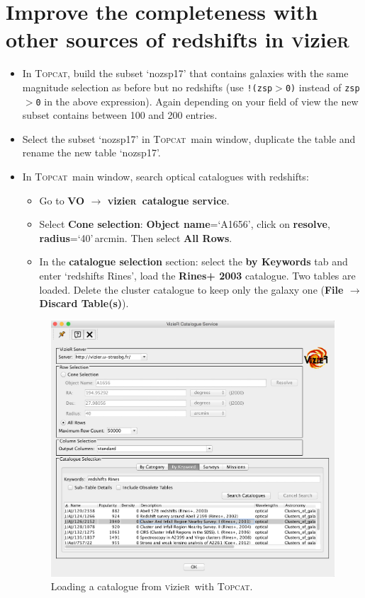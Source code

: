 \documentclass [a4paper, 12pt]{article}
\newcommand{\topcat}{{\textsc{Topcat}}}
\newcommand{\vizier}{{\textsc{v}izie\textsc{r}}}
\begin{document}
\section{Improve the completeness with other sources of redshifts in \vizier}

\begin{itemize}
\item In \topcat, build the subset `nozsp17' that contains galaxies with 
the same magnitude selection as before but no redshifts (use 
\texttt{!(zsp$>$0)} 
instead of \texttt{zsp$>$0} in the above expression). Again depending on your 
field of view the new subset contains between 100 and 200 entries.
\item Select the subset `nozsp17' in \topcat\ main window, duplicate the table and rename the new table `nozsp17'.
\item In \topcat\ main window, search optical catalogues with redshifts:
\begin{itemize}
    \item Go to \textbf{VO $\rightarrow$ \vizier\ catalogue service}.
    \item Select \textbf{Cone selection}: \textbf{Object name}=`A1656', click 
    on \textbf{resolve}, \textbf{radius}=`40'\,arcmin. Then select \textbf{All 
    Rows}.
    \item In the \textbf{catalogue selection} section: select the \textbf{by 
    Keywords} tab and enter `redshifts Rines', load the \textbf{Rines+ 2003} 
    catalogue. Two tables are loaded. Delete the cluster catalogue to keep only 
    the galaxy one (\textbf{File $\rightarrow$ Discard Table(s)}).
\end{itemize}

\begin{figure}[H]
\center
\includegraphics[width=0.5  \textwidth]{../images/topcat_vizier_rines2003.jpg}
\caption{Loading a catalogue from \vizier\ with \topcat.}
\label{fig:topcatvizier}
\end{figure}


\end{itemize}
\end{document}
